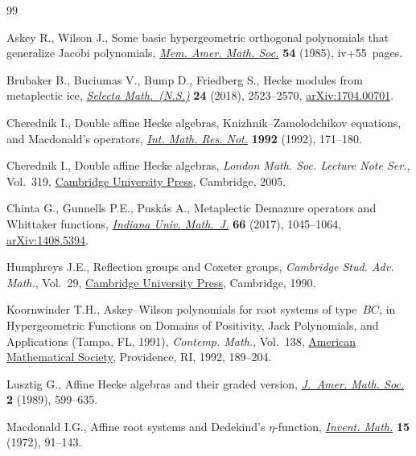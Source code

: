 \documentclass[pdftex]{sigma}
\numberwithin{equation}{section}
\begin{document}
\begin{thebibliography}{99}
\footnotesize\itemsep=0pt

Askey R., Wilson J., Some basic hypergeometric orthogonal polynomials that
 generalize {J}acobi polynomials,
 \href{https://doi.org/10.1090/memo/0319}{\textit{Mem. Amer. Math. Soc.}}
 \textbf{54} (1985), iv+55~pages.

Brubaker B., Buciumas V., Bump D., Friedberg S., Hecke modules from metaplectic
 ice, \href{https://doi.org/10.1007/s00029-017-0372-0}{\textit{Selecta Math.~(N.S.)}} \textbf{24} (2018), 2523--2570,
 \href{http://arxiv.org/abs/1704.00701}{arXiv:1704.00701}.

Cherednik I., Double affine {H}ecke algebras, {K}nizhnik--{Z}amolodchikov
 equations, and {M}acdonald's operators,
 \href{https://doi.org/10.1155/S1073792892000199}{\textit{Int. Math. Res.
 Not.}} \textbf{1992} (1992), 171--180.

Cherednik I., Double affine {H}ecke algebras, \textit{London Math. Soc. Lecture
 Note Ser.}, Vol.~319,
 \href{https://doi.org/10.1017/CBO9780511546501}{Cambridge University Press},
 Cambridge, 2005.

Chinta G., Gunnells P.E., Pusk\'as A., Metaplectic {D}emazure operators and
 {W}hittaker functions,
 \href{https://doi.org/10.1512/iumj.2017.66.6068}{\textit{Indiana Univ.
 Math.~J.}} \textbf{66} (2017), 1045--1064,
 \href{http://arxiv.org/abs/1408.5394}{arXiv:1408.5394}.

Humphreys J.E., Reflection groups and {C}oxeter groups, \textit{Cambridge Stud.
 Adv. Math.}, Vol.~29,
 \href{https://doi.org/10.1017/CBO9780511623646}{Cambridge University Press},
 Cambridge, 1990.

Koornwinder T.H., Askey--{W}ilson polynomials for root systems of type~{$BC$},
 in Hypergeometric Functions on Domains of Positivity, {J}ack Polynomials, and
 Applications ({T}ampa, {FL}, 1991), \textit{Contemp. Math.}, Vol.~138,
 \href{https://doi.org/10.1090/conm/138/1199128}{American Mathematical
 Society}, Providence, RI, 1992, 189--204.

Lusztig G., Affine {H}ecke algebras and their graded version,
 \href{https://doi.org/10.2307/1990945}{\textit{J.~Amer. Math. Soc.}}
 \textbf{2} (1989), 599--635.

Macdonald I.G., Affine root systems and {D}edekind's {$\eta $}-function,
 \href{https://doi.org/10.1007/BF01418931}{\textit{Invent. Math.}} \textbf{15}
 (1972), 91--143.


\end{thebibliography}
\end{document}
